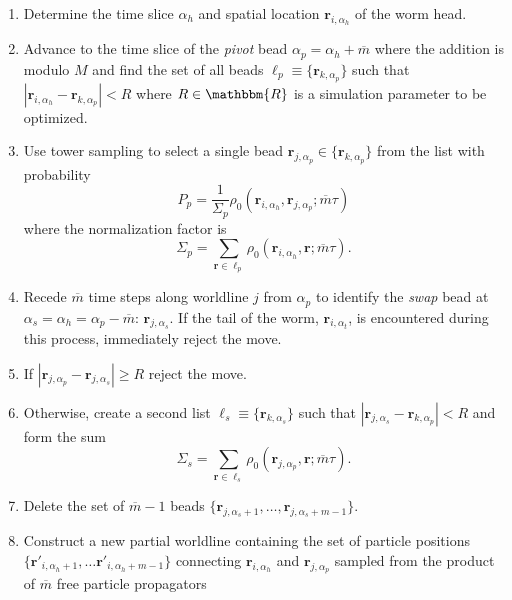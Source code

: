 \documentclass[prb,aps,amssym,nofootinbib,floatfix,notitlepage]{revtex4-1}
\renewcommand{\vec}[1]{\boldsymbol{#1}}
\begin{document}
\begin{enumerate}
    \item Determine the time slice $\alpha_h$ and spatial location
        $\vec{r}_{i,\alpha_h}$ of the worm head.
    \item Advance to the time slice of the \emph{pivot} bead $\alpha_p =
        \alpha_h + \overline{m}$ where the addition is modulo $M$ and find the
        set of all beads $\ell_p \equiv \{\vec{r}_{k,\alpha_p}\}$ such that
        $|\vec{r}_{i,\alpha_h} - \vec{r}_{k,\alpha_p}| < R$ where $R \in
        \mathbbm{R}$ is a simulation parameter to be optimized.
\item Use tower sampling to select a single bead $\vec{r}_{j,\alpha_p} \in
    \{\vec{r}_{k,\alpha_p}\}$ from the list with probability
\begin{equation}
    P_p = \frac{1}{\Sigma_p}
    \rho_0(\vec{r}_{i,\alpha_h},\vec{r}_{j,\alpha_p};\overline{m}\tau)
\end{equation}
%
where the normalization factor is
%
\begin{equation}
\Sigma_p = \sum_{\vec{r}\in\ell_p} 
    \rho_0(\vec{r}_{i,\alpha_h},\vec{r};\overline{m}\tau).
\end{equation}
%
\item Recede $\overline{m}$ time steps along worldline $j$ from $\alpha_p$ to
    identify the \emph{swap} bead at $\alpha_s = \alpha_h =
    \alpha_p-\overline{m}$: $\vec{r}_{j,\alpha_s}$. If the tail of the worm,
    $\vec{r}_{i,\alpha_t}$, is encountered during this process, immediately reject the move.
\item If $|\vec{r}_{j,\alpha_p} - \vec{r}_{j,\alpha_s}| \ge R$ reject the move.
\item Otherwise, create a second list $\ell_s \equiv \{\vec{r}_{k,\alpha_s}\}$ such
    that $|\vec{r}_{j,\alpha_s} - \vec{r}_{k,\alpha_p}| < R$ and form the sum
\begin{equation}
\Sigma_s = \sum_{\vec{r}\in\ell_s} 
    \rho_0(\vec{r}_{j,\alpha_p},\vec{r};\overline{m}\tau).
\end{equation}
%
\item Delete the set of $\overline{m}-1$ beads
    $\{\vec{r}_{j,\alpha_s+1},\ldots,\vec{r}_{j,\alpha_s+m-1} \}$.
\item Construct a new partial worldline containing the set of particle
    positions $\{\vec{r}'_{i,\alpha_h+1},\ldots \vec{r}'_{i,\alpha_h+m-1}\}$
    connecting $\vec{r}_{i,\alpha_h}$ and $\vec{r}_{j,\alpha_p}$ sampled from
    the product of $\overline{m}$ free particle propagators

\end{enumerate}
\end{document}
